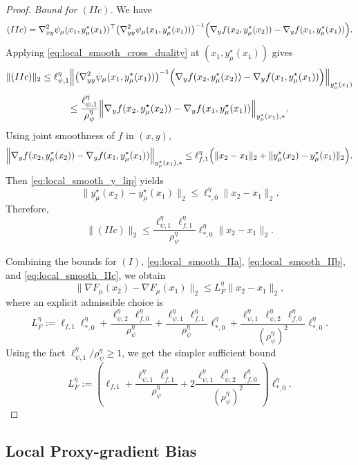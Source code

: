 \documentclass{article}
\begin{document}
\begin{proof}
\smallskip
\noindent\emph{Bound for \((IIc)\).}
We have
\[
(IIc)
=
\nabla^2_{xy}\psi_\mu(x_1,y_\mu^\star(x_1))^\top
\bigl(\nabla^2_{yy}\psi_\mu(x_1,y_\mu^\star(x_1))\bigr)^{-1}
\Bigl(
\nabla_y f(x_2,y_\mu^\star(x_2))
-
\nabla_y f(x_1,y_\mu^\star(x_1))
\Bigr).
\]
Applying \eqref{eq:local_smooth_cross_duality} at
\((x_1,y_\mu^\star(x_1))\) gives
\[
\|(IIc)\|_2
\le
\ell_{\psi,1}^\eta
\Bigl\|
\bigl(\nabla^2_{yy}\psi_\mu(x_1,y_\mu^\star(x_1))\bigr)^{-1}
\Bigl(
\nabla_y f(x_2,y_\mu^\star(x_2))
-
\nabla_y f(x_1,y_\mu^\star(x_1))
\Bigr)
\Bigr\|_{y_\mu^\star(x_1)}
\]
\[
\le
\frac{\ell_{\psi,1}^\eta}{\rho_\psi^\eta}
\Bigl\|
\nabla_y f(x_2,y_\mu^\star(x_2))
-
\nabla_y f(x_1,y_\mu^\star(x_1))
\Bigr\|_{y_\mu^\star(x_1),*}.
\]
Using joint smoothness of \(f\) in \((x,y)\),
\[
\Bigl\|
\nabla_y f(x_2,y_\mu^\star(x_2))
-
\nabla_y f(x_1,y_\mu^\star(x_1))
\Bigr\|_{y_\mu^\star(x_1),*}
\le
\ell_{f,1}^\eta
\Bigl(
\|x_2-x_1\|_2
+
\|y_\mu^\star(x_2)-y_\mu^\star(x_1)\|_2
\Bigr).
\]
Then \eqref{eq:local_smooth_y_lip} yields
\[
\|y_\mu^\star(x_2)-y_\mu^\star(x_1)\|_2
\le
\ell_{*,0}^\eta\|x_2-x_1\|_2.
\]
Therefore,
\begin{equation}
\label{eq:local_smooth_IIc}
\|(IIc)\|_2
\le
\frac{\ell_{\psi,1}^\eta\,\ell_{f,1}^\eta}{\rho_\psi^\eta}
\ell_{*,0}^\eta
\|x_2-x_1\|_2.
\end{equation}

Combining the bounds for \((I)\), \eqref{eq:local_smooth_IIa},
\eqref{eq:local_smooth_IIb}, and \eqref{eq:local_smooth_IIc}, we obtain
\[
\|\nabla F_\mu(x_2)-\nabla F_\mu(x_1)\|_2
\le
L_F^\eta\|x_2-x_1\|_2,
\]
where an explicit admissible choice is
\begin{equation}
\label{eq:LF_explicit}
L_F^\eta
:=
\ell_{f,1}\ell_{*,0}^\eta
+
\frac{\ell_{\psi,2}^\eta\,\ell_{f,0}^\eta}{\rho_\psi^\eta}
+
\frac{\ell_{\psi,1}^\eta\,\ell_{f,1}^\eta}{\rho_\psi^\eta}
\ell_{*,0}^\eta
+
\frac{\ell_{\psi,1}^\eta\,\ell_{\psi,2}^\eta\,\ell_{f,0}^\eta}
{(\rho_\psi^\eta)^2}
\ell_{*,0}^\eta .
\end{equation}
Using the fact \(\ell_{\psi,1}^\eta/\rho_\psi^\eta\ge 1\), we get the simpler sufficient bound
\begin{equation}
\label{eq:LF_simplified}
L_F^\eta
:=
\left(
\ell_{f,1}
+
\frac{\ell_{\psi,1}^\eta\,\ell_{f,1}^\eta}{\rho_\psi^\eta}
+
2\frac{\ell_{\psi,1}^\eta\,\ell_{\psi,2}^\eta\,\ell_{f,0}^\eta}
{(\rho_\psi^\eta)^2}
\right)
\ell_{*,0}^\eta .
\end{equation}
\end{proof}


\subsection{Local Proxy-gradient Bias}
\end{document}
